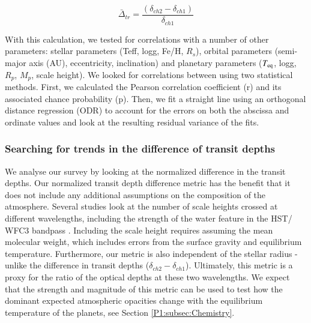 \begin{equation}
     \bar{\Delta}_{tr} = \frac{(\delta_{ch2} - \delta_{ch1})}{\delta_{ch1}}
\end{equation}

With this calculation, we tested for correlations with a number of other parameters:  stellar parameters (Teff, logg, Fe/H, $R_s$), orbital parameters (semi-major axis (AU), eccentricity, inclination) and planetary parameters ($T_{\rm eq}$, logg, $R_p$, $M_p$, scale height). We looked for correlations between using two statistical methods. First, we calculated the Pearson correlation coefficient (r) and its associated chance probability (p). Then, we fit a straight line using an orthogonal distance regression (ODR) to account for the errors on both the abscissa and ordinate values \citet{Boggs1989} and look at the resulting residual variance of the fits.

\subsubsection{Searching for trends in the difference of transit depths}

We analyse our \spitzer survey by looking at the normalized difference in the transit depths. Our normalized transit depth difference metric has the benefit that it does not include any additional assumptions on the composition of the atmosphere.  Several studies look at the number of scale heights crossed at different wavelengths, including the strength of the water feature in the HST/ WFC3 bandpass \citep[e.g.,][]{Sing2016}. Including the scale height requires assuming the mean molecular weight, which includes errors from the surface gravity and equilibrium temperature. Furthermore, our metric is also independent of the stellar radius - unlike the difference in transit depths ($\delta_{ch2} - \delta_{ch1}$). Ultimately, this metric is a proxy for the ratio of the optical depths at these two wavelengths. We expect that the strength and magnitude of this metric can be used to test how the dominant expected atmospheric opacities change with the equilibrium temperature of the planets, see Section \ref{P1:subsec:Chemistry}.

